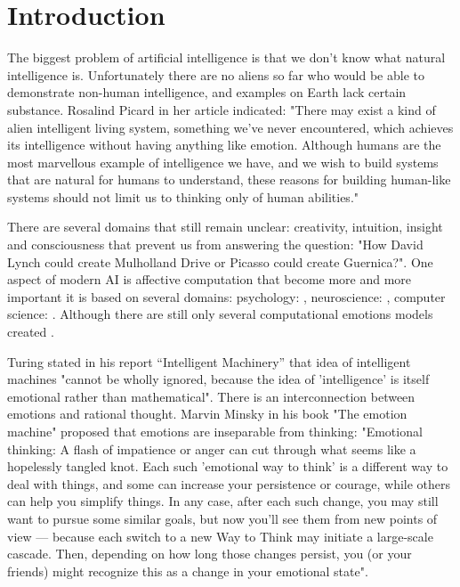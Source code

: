 \section{Introduction}

The biggest problem of artificial intelligence is that we don't know what natural intelligence is. Unfortunately there are no aliens so far who would be able to demonstrate non-human intelligence, and examples on Earth lack certain substance. Rosalind Picard in her article indicated: "There may exist a kind of alien intelligent living system, something we’ve never encountered, which achieves its  intelligence without having anything like emotion. Although humans are the most marvellous example of intelligence we have, and we wish to build systems that are natural for humans to understand, these reasons for building human-like systems should not limit us to thinking only of human abilities." \cite{affectivecomputingchallanges}

There are several domains that still remain unclear: creativity, intuition, insight and consciousness that prevent us from answering the question: "How David Lynch could create Mulholland Drive or Picasso could create Guernica?". One aspect of modern AI is affective computation that become more and more important it is based on several domains: psychology: \cite{natureofemotions, appraisal_determinants_of_emotions, appraisal_considered_as_a_process, putting_appraisal_in_context, sex_differencies}, neuroscience: \cite{emotionsbraintorobot, parsingreward, neuromodulatory, cubeofemotions, natureofemotions, putting_appraisal_in_context, anatomic}, computer science: \cite{intelligent_machinery, emotionandsociable, senticcomputing, hourglass, affectivemodelofinterplay, affectivecomputing, dont_worry_be_happy, hourglass, senticcomputing, parsingreward, emotionsbraintorobot, motivationalrewardframework, roleofemotions, computationalmodelsemotionscognition}. Although there are still only several computational emotions models created \cite{computationalmodelsemotion, computationalmodelsemotionscognition, evaluatingcomutationalmodel, threelevel}.

Turing stated in his report ``Intelligent Machinery'' \cite{intelligent_machinery} that idea of intelligent machines "cannot be wholly ignored, because the idea of 'intelligence' is itself emotional rather than mathematical".
There is an interconnection between emotions and rational thought. Marvin Minsky in his book "The emotion machine" proposed that emotions are inseparable from thinking: "Emotional thinking: A flash of impatience or anger can cut through what seems like a hopelessly tangled knot. Each such 'emotional way to think' is a different way to deal with things, and some can increase your persistence or courage, while others can help you simplify things. In any case, after each such change, you may still want to pursue some similar goals, but now you'll see them from new points of view — because each switch to a new Way to Think may initiate a large-scale cascade. Then, depending on how long those changes persist, you (or your friends) might recognize this as a change in your emotional state".

